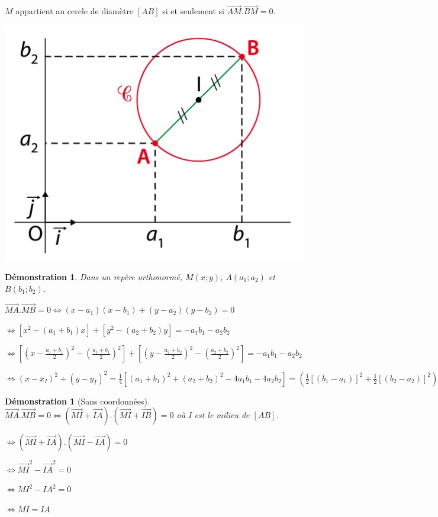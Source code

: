 \documentclass[a4paper,11pt]{article}
\theoremstyle{break}
\newcounter{enonce}
\newtheorem{demonstration}[enonce]{Démonstration}
\begin{document}
\begin{theorem}
 $M$ appartient au cercle de diamètre $[AB]$ si et seulement si $\vec{AM}.\vec{BM}=0$.
 
      \begin{center}
    \includegraphics[scale=0.5]{../Images/cercleDiametre.png}
  \end{center}
\end{theorem}

\begin{demonstration}
 Dans un repère orthonormé, $M(x;y)$, $A(a_1;a_2)$ et $B(b_1;b_2)$.
 
 $\vec{MA}.\vec{MB}=0 \Leftrightarrow (x-a_1)(x-b_1)+(y-a_2)(y-b_2)=0$
 
 $\Leftrightarrow [x^2-(a_1+b_1)x]+[y^2-(a_2+b_2)y]=-a_1b_1-a_2b_2$
 
 $\Leftrightarrow [(x-\frac{a_1+b_1}{2})^2-(\frac{a_1+b_1}{2})^2]+[(y-\frac{a_2+b_2}{2})^2-(\frac{a_2+b_2}{2})^2]=-a_1b_1-a_2b_2$
 
 $\Leftrightarrow (x-x_I)^2+(y-y_I)^2=\frac{1}{4}[(a_1+b_1)^2+(a_2+b_2)^2-4a_1b_1-4a_2b_2]=(\frac{1}{2}[(b_1-a_1)]^2+\frac{1}{2}[(b_2-a_2)]^2)=(\frac{AB}{2})^2$
\end{demonstration}

\begin{demonstration}[Sans coordonnées]
 $\vec{MA}.\vec{MB}=0 \Leftrightarrow (\vec{MI}+\vec{IA}).(\vec{MI}+\vec{IB})=0$ où I est le milieu de $[AB]$.
 
 $\Leftrightarrow (\vec{MI}+\vec{IA}).(\vec{MI}-\vec{IA})=0$
 
 $\Leftrightarrow \vec{MI}^2-\vec{IA}^2=0$
 
 $\Leftrightarrow MI^2-IA^2=0$
 
 $\Leftrightarrow MI=IA$
\end{demonstration}
\end{document}
